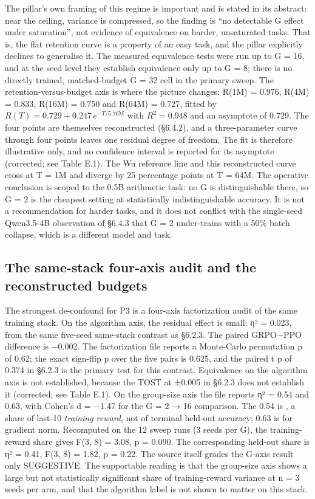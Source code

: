 \documentclass[12pt,a4paper]{report}
\newcommand{\longtok}[1]{\texttt{\seqsplit{#1}}}
\begin{document}
The pillar's own framing of this regime is important and is stated in
its abstract: near the ceiling, variance is compressed, so the finding
is ``no detectable G effect under saturation'', not evidence of
equivalence on harder, unsaturated tasks. That is, the flat retention
curve is a property of an easy task, and the pillar explicitly declines
to generalise it. The measured equivalence tests were run up to G = 16,
and at the seed level they establish equivalence only up to G = 8; there
is no directly trained, matched-budget G = 32 cell in the primary sweep.
The retention-versus-budget axis is where the picture changes: R(1M) =
0.976, R(4M) = 0.833, R(16M) = 0.750 and R(64M) = 0.727, fitted by
\(R(T) = 0.729 + 0.247\,e^{-T/5.76\mathrm{M}}\) with \(R^2 = 0.948\) and
an asymptote of 0.729. The four points are themselves reconstructed
(§6.4.2), and a three-parameter curve through four points leaves one
residual degree of freedom. The fit is therefore illustrative only, and
no confidence interval is reported for its asymptote (corrected; see
Table E.1). The Wu reference line and this reconstructed curve cross at
T = 1M and diverge by 25 percentage points at T = 64M. The operative
conclusion is scoped to the 0.5B arithmetic task: no G is
distinguishable there, so G = 2 is the cheapest setting at statistically
indistinguishable accuracy. It is not a recommendation for harder tasks,
and it does not conflict with the single-seed Qwen3.5-4B observation of
§6.4.3 that G = 2 under-trains with a 50\% batch collapse, which is a
different model and task.

\subsection{The same-stack four-axis audit and the reconstructed
budgets}\label{the-same-stack-four-axis-audit-and-the-reconstructed-budgets}

The strongest de-confound for P3 is a four-axis factorization audit of
the same training stack. On the algorithm axis, the residual effect is
small: η² = 0.023, from the same five-seed same-stack contrast as
§6.2.3. The paired GRPO−PPO difference is −0.002. The factorization file
reports a Monte-Carlo permutation p of 0.62; the exact sign-flip p over
the five pairs is 0.625, and the paired t p of 0.374 in §6.2.3 is the
primary test for this contrast. Equivalence on the algorithm axis is not
established, because the TOST at ±0.005 in §6.2.3 does not establish it
(corrected; see Table E.1). On the group-size axis the file reports η² =
0.54 and 0.63, with Cohen's d = −1.47 for the G = 2 → 16 comparison. The
0.54 is \longtok{eta2\_\allowbreak{}G\_\allowbreak{}last10}, a share of last-10 \emph{training
reward}, not of terminal held-out accuracy; 0.63 is for gradient norm.
Recomputed on the 12 sweep runs (3 seeds per G), the training-reward
share gives F(3, 8) = 3.08, p = 0.090. The corresponding held-out share
is η² = 0.41, F(3, 8) = 1.82, p = 0.22. The source itself grades the
G-axis result only SUGGESTIVE. The supportable reading is that the
group-size axis shows a large but not statistically significant share of
training-reward variance at n = 3 seeds per arm, and that the algorithm
label is not shown to matter on this stack.
\end{document}
